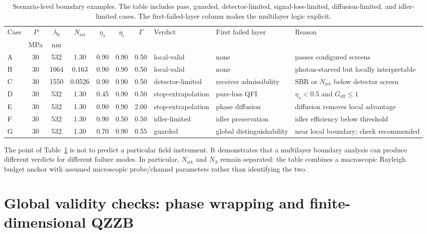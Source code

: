 \documentclass[a4paper,11pt]{article}
\numberwithin{equation}{section}
\newcommand{\Nret}{N_{\mathrm{ret}}}
\newcommand{\Ns}{N_{S}}
\newcommand{\etas}{\eta_s}
\newcommand{\etai}{\eta_i}
\newcommand{\Geff}{G_{\mathrm{eff}}}
\begin{document}
\begin{table}[htbp]
\centering
\caption{Scenario-level boundary examples. The table includes pass, guarded, detector-limited, signal-loss-limited, diffusion-limited, and idler-limited cases. The first-failed-layer column makes the multilayer logic explicit.}
\label{tab:scenario_verdicts}
\tiny
\renewcommand{\arraystretch}{1.12}
\begin{tabularx}{\textwidth}{l c c c c c c p{}p{}X}
\toprule
Case & $P$ & $\lambda_0$ & $\Nret$ & $\etas$ & $\etai$ & $\Gamma$ & Verdict & First failed layer & Reason \\
 & MPa & nm &  &  &  &  &  &  &  \\
\midrule
A & 30 & 532 & 1.30 & 0.90 & 0.90 & 0.50 & local-valid & none & passes configured screens \\
B & 30 & 1064 & 0.163 & 0.90 & 0.90 & 0.50 & local-valid & none & photon-starved but locally interpretable \\
C & 30 & 1550 & 0.0526 & 0.90 & 0.90 & 0.50 & detector-limited & receiver admissibility & SBR or $\Nret$ below detector screen \\
D & 30 & 532 & 1.30 & 0.45 & 0.90 & 0.50 & stop-extrapolation & pure-loss QFI & $\etas<0.5$ and $\Geff\le1$ \\
E & 30 & 532 & 1.30 & 0.90 & 0.90 & 2.00 & stop-extrapolation & phase diffusion & diffusion removes local advantage \\
F & 30 & 532 & 1.30 & 0.90 & 0.50 & 0.50 & idler-limited & idler preservation & idler efficiency below threshold \\
G & 30 & 532 & 1.30 & 0.70 & 0.90 & 0.55 & guarded & global distinguishability & near local boundary; check recommended \\
\bottomrule
\end{tabularx}
\end{table}

The point of Table~\ref{tab:scenario_verdicts} is not to predict a particular field instrument. It demonstrates that a multilayer boundary analysis can produce different verdicts for different failure modes. In particular, $\Nret$ and $\Ns$ remain separated: the table combines a macroscopic Rayleigh budget anchor with assumed microscopic probe/channel parameters rather than identifying the two.

\section{Global validity checks: phase wrapping and finite-dimensional QZZB}
\label{sec:qzzb}
\end{document}
